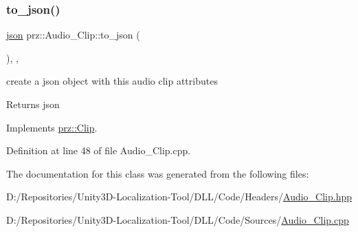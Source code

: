\subsubsection{\texorpdfstring{to\_json()}{to\_json()}}
{\footnotesize\ttfamily \mbox{\hyperlink{namespaceprz_a2d8e9eeb62cf098759f1fff869da67f7}{json}} prz\+::\+Audio\+\_\+\+Clip\+::to\+\_\+json (\begin{DoxyParamCaption}{ }\end{DoxyParamCaption})\hspace{0.3cm}{\ttfamily [final]}, {\ttfamily [override]}, {\ttfamily [virtual]}}



create a json object with this audio clip attributes 

\begin{DoxyReturn}{Returns}
json 
\end{DoxyReturn}


Implements \mbox{\hyperlink{classprz_1_1_clip_a4959ada0fab0fbac6cb5239578ac3ec6}{prz\+::\+Clip}}.



Definition at line 48 of file Audio\+\_\+\+Clip.\+cpp.



The documentation for this class was generated from the following files\+:\begin{DoxyCompactItemize}
\item 
D\+:/\+Repositories/\+Unity3\+D-\/\+Localization-\/\+Tool/\+D\+L\+L/\+Code/\+Headers/\mbox{\hyperlink{_audio___clip_8hpp}{Audio\+\_\+\+Clip.\+hpp}}\item 
D\+:/\+Repositories/\+Unity3\+D-\/\+Localization-\/\+Tool/\+D\+L\+L/\+Code/\+Sources/\mbox{\hyperlink{_audio___clip_8cpp}{Audio\+\_\+\+Clip.\+cpp}}\end{DoxyCompactItemize}
